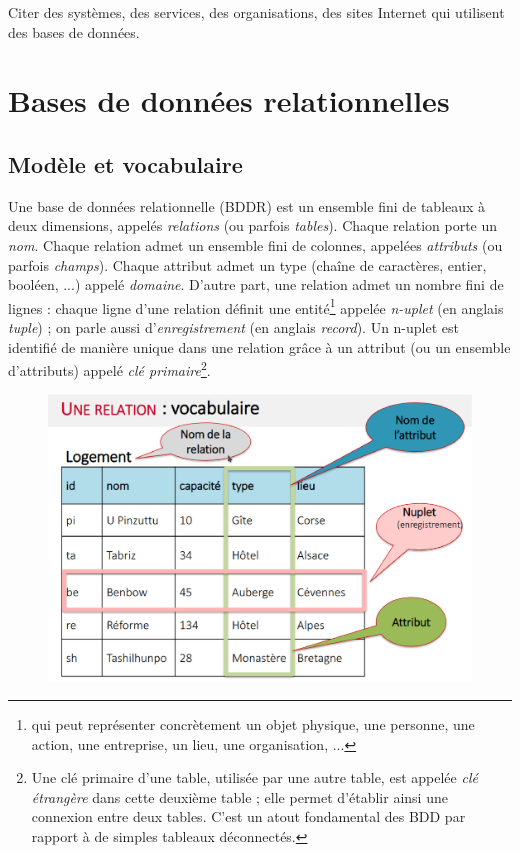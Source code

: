 \documentclass[11pt,a4paper,french,twoside]{PMCours}
\begin{document}
Citer des systèmes, des services, des organisations, des sites Internet qui utilisent des bases de données.



\section{Bases de données relationnelles}

\subsection{Modèle et vocabulaire}

\begin{Definition}{}
Une base de données relationnelle (BDDR) est un ensemble fini de tableaux à deux dimensions, appelés \emph{relations} (ou parfois \emph{tables}). Chaque relation porte un \emph{nom}. Chaque relation admet un ensemble fini de colonnes, appelées \emph{attributs} (ou parfois \emph{champs}). Chaque attribut admet un type (chaîne de caractères, entier, booléen, ...) appelé \emph{domaine}. D'autre part, une relation admet un nombre fini de lignes : chaque ligne d'une relation définit une entité\footnote{qui peut représenter concrètement un objet physique, une personne, une action, une entreprise, un lieu, une organisation, ...} appelée \emph{n-uplet} (en anglais \emph{tuple}) ; on parle aussi d'\emph{enregistrement} (en anglais \emph{record}). Un n-uplet est identifié de manière unique dans une relation grâce à un attribut (ou un ensemble d'attributs) appelé \emph{clé primaire}\footnote{Une clé primaire d'une table, utilisée par une autre table, est appelée \emph{clé étrangère} dans cette deuxième table ; elle permet d'établir ainsi une connexion entre deux tables. C'est un atout fondamental des BDD par rapport à de simples tableaux déconnectés.}.
\end{Definition}

\newpage

\begin{figure}[ht]
\centering
\includegraphics[width=12cm]{voca_graphique.eps}
\end{figure}
\end{document}
